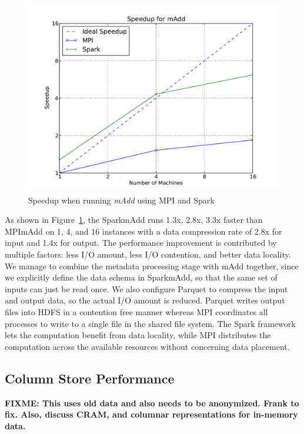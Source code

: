 \documentclass{acm_proc_article-sp}
\begin{document}
\begin{figure}[h]
\begin{center}
\includegraphics[width=0.99\linewidth]{graphs/speedup_madd.pdf}
\end{center}
\caption{Speedup when running \textit{mAdd} using MPI and Spark}
\label{fig:madd-speedup}
\end{figure}

As shown in Figure~\ref{fig:madd-speedup}, the SparkmAdd runs 1.3x, 2.8x, 3.3x faster than MPImAdd on
1, 4, and 16 instances with a data compression rate of 2.8x for input and 1.4x for output. The performance
improvement is contributed by multiple factors: less I/O amount, less I/O contention, and better data
locality. We manage to combine the metadata processing stage with mAdd together, since we explicitly
define the data schema in SparkmAdd, so that the same set of inputs can just be read once. We also
configure Parquet to compress the input and output data, so the actual I/O amount is reduced. Parquet
writes output files into HDFS in a contention free manner whereas MPI coordinates all processes to write to
a single file in the shared file system. The Spark framework lets the computation benefit from data locality,
while MPI distributes the computation across the available resources without concerning data placement.

\subsection{Column Store Performance}
\label{sec:column-store-perf}

\textbf{FIXME: This uses old data and also needs to be anonymized. Frank to fix. Also, discuss CRAM, and columnar representations for in-memory data.}
\end{document}
